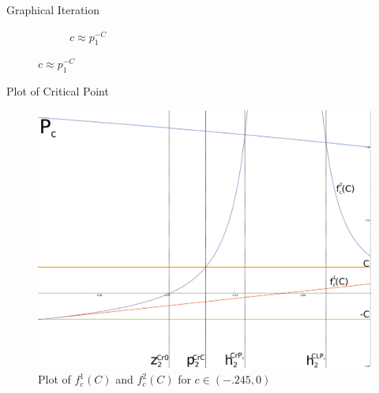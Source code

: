 \documentclass{beamer}
\newcommand{\<}{\left\langle}
\renewcommand{\>}{\right\rangle} %
\renewcommand{\*}{\cdot} %
\begin{document}
\begin{frame}{Graphical Iteration}
\begin{figure}[h]
\begin{subfigure}[b]{0.4\textwidth}
				\caption{$c \approx p_1^{-C}$}
		\end{subfigure}
	\end{figure}
\end{frame}



\begin{frame}{Plot of Critical Point}
	\begin{figure}
		\centering
		\includegraphics[width=.8\textwidth]{./img/2it}
		\caption{Plot of $f^1_c (C)$ and $f^2_c (C)$ for $c \in (-.245,0)$}
	\end{figure}
\end{frame}
\end{document}
